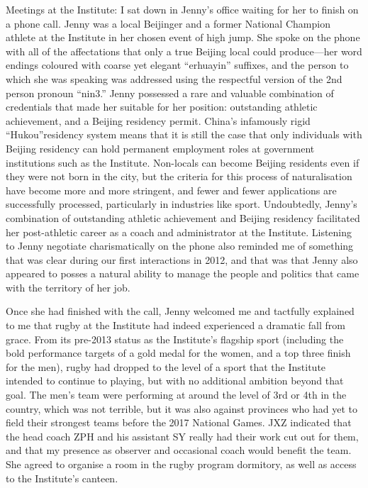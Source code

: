 {Meetings at the Institute:
I sat down in Jenny's office waiting for her to finish on a phone call. Jenny was a local Beijinger and a former National Champion athlete at the Institute in her chosen event of high jump. She spoke on the phone with all of the affectations that only a true Beijing local could produce---her word endings coloured with coarse yet elegant ``erhuayin'' suffixes, and the person to which she was speaking was addressed using the respectful version of the 2nd person pronoun ``nin3.''  Jenny possessed a rare and valuable combination of credentials that made her suitable for her position:  outstanding athletic achievement, and a Beijing residency permit.  China's infamously rigid ``Hukou''residency system means that it is still the case that only individuals with Beijing residency can hold permanent employment roles at government institutions such as the Institute.  Non-locals can become Beijing residents even if they were not born in the city, but the criteria for this process of naturalisation have become more and more stringent, and fewer and fewer applications are successfully processed, particularly in industries like sport.  Undoubtedly, Jenny's combination of outstanding athletic achievement and Beijing residency facilitated her post-athletic career as a coach and administrator at the Institute.  Listening to Jenny negotiate charismatically on the phone also reminded me of something that was clear during our first interactions in 2012, and that was that Jenny also appeared to posses a natural ability to manage the people and politics that came with the territory of her job.

Once she had finished with the call, Jenny welcomed me and tactfully explained to me that rugby at the Institute had indeed experienced a dramatic fall from grace. From its pre-2013 status as the Institute's flagship sport (including the bold performance targets of a gold medal for the women, and a top three finish for the men), rugby had dropped to the level of a sport that the Institute intended to continue to playing, but with no additional ambition beyond that goal. The men's team were performing at around the level of 3rd or 4th in the country, which was not terrible, but it was also against provinces who had yet to field their strongest teams before the 2017 National Games.  JXZ indicated that the head coach ZPH and his assistant SY really had their work cut out for them, and that my presence as observer and occasional coach would benefit the team.  She agreed to organise a room in the rugby program dormitory, as well as access to the Institute's canteen.


}
